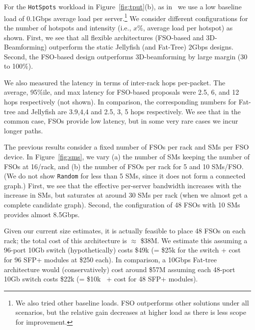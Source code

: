 For the {\tt HotSpots} workload in Figure~\ref{fig:tput}(b), as
in~\cite{3db} we use a low baseline load of 0.1Gbps average load per
server.\footnote{We also tried other baseline loads. FSO
  outperforms other solutions under all scenarios, but the relative gain
  decreases at higher load as there is less scope for
  improvement.}  We consider different configurations for the number
of hotspots and intensity (i.e., $x\%$, average load per hotspot) as
shown. First, we see that all flexible architectures (FSO-based and
3D-Beamforming) outperform the static Jellyfish (and Fat-Tree) 2Gbps
designs.  Second, the FSO-based design outperforms 3D-beamforming by
large margin (30 to 100\%).

We also measured the latency in terms of inter-rack hops per-packet.
The average, 95\%ile, and max latency for FSO-based proposals were
2.5, 6, and 12 hops respectively (not shown). In comparison, the
corresponding numbers for Fat-tree and Jellyfish are 3.9,4,4 and
 2.5, 3, 5 hops respectively. We see that in the common case, FSOs
provide low latency, but in some very rare cases we incur longer
paths.



 The previous results consider a fixed number of
FSOs per rack and SMs per FSO device. In Figure~\ref{fig:sms}, we vary (a) the
number of SMs keeping the number of FSOs at 16/rack, and (b) the number of
FSOs per rack for 5 and 10 SMs/FSO.  (We do not show  {\tt Random} for less
than 5 SMs, since it does not form a connected graph.) First, we see that the
effective per-server bandwidth increases with the increase in SMs, but
saturates at around 30 SMs per rack (when we almost get a complete candidate
graph).  Second, the configuration of 48 FSOs with 10 SMs provides almost
8.5Gbps. 

Given our current size estimates, it is actually feasible to place 48
FSOs on each rack; the total cost of this architecture is $\approx$
\$38M.  We estimate this assuming a 96-port 10Gb switch (hypothetically)
costs \$49k (= \$25k for the  switch + cost for 96 SFP+ modules at \$250
each).  In comparison, a 10Gbps Fat-tree architecture would
(conservatively) cost around \$57M assuming each 48-port 10Gb switch
costs \$22k (= \$10k~\cite{48-10-switch} + cost for 48 SFP+ modules).
